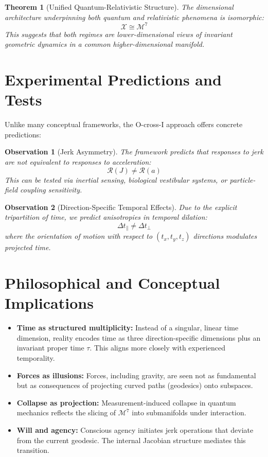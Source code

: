 \documentclass{article}
\newtheorem{theorem}{Theorem}
\newtheorem{observation}{Observation}
\begin{document}
\begin{theorem}[Unified Quantum-Relativistic Structure]
The dimensional architecture underpinning both quantum and relativistic phenomena is isomorphic:
\begin{equation}
\mathcal{X} \cong \mathcal{M}^7
\end{equation}
This suggests that both regimes are lower-dimensional views of invariant geometric dynamics in a common higher-dimensional manifold.
\end{theorem}

\section{Experimental Predictions and Tests}

Unlike many conceptual frameworks, the O-cross-I approach offers concrete predictions:

\begin{observation}[Jerk Asymmetry]
The framework predicts that responses to jerk are not equivalent to responses to acceleration:
\begin{equation}
\mathcal{R}(J) \neq \mathcal{R}(a)
\end{equation}
This can be tested via inertial sensing, biological vestibular systems, or particle-field coupling sensitivity.
\end{observation}

\begin{observation}[Direction-Specific Temporal Effects]
Due to the explicit tripartition of time, we predict anisotropies in temporal dilation:
\begin{equation}
\Delta t_{\parallel} \neq \Delta t_{\perp}
\end{equation}
where the orientation of motion with respect to \( (t_x, t_y, t_z) \) directions modulates projected time.
\end{observation}

\section{Philosophical and Conceptual Implications}

\begin{itemize}
    \item \textbf{Time as structured multiplicity:} Instead of a singular, linear time dimension, reality encodes time as three direction-specific dimensions plus an invariant proper time \( \tau \). This aligns more closely with experienced temporality.
    \item \textbf{Forces as illusions:} Forces, including gravity, are seen not as fundamental but as consequences of projecting curved paths (geodesics) onto subspaces.
    \item \textbf{Collapse as projection:} Measurement-induced collapse in quantum mechanics reflects the slicing of \( \mathcal{M}^7 \) into submanifolds under interaction.
    \item \textbf{Will and agency:} Conscious agency initiates jerk operations that deviate from the current geodesic. The internal Jacobian structure mediates this transition.
\end{itemize}
\end{document}
